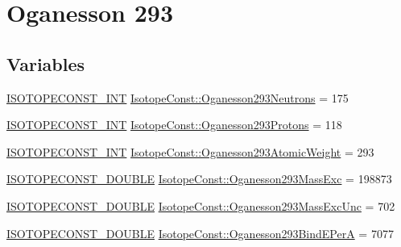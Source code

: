 \hypertarget{group___isotope_const-_oganesson-_og293}{}\section{Oganesson 293}
\label{group___isotope_const-_oganesson-_og293}
\subsection*{Variables}
\begin{DoxyCompactItemize}
\item 
\mbox{\hyperlink{group___isotope_const-_macros_ga5f18360b3e99483a35c32d789e62621c}{I\+S\+O\+T\+O\+P\+E\+C\+O\+N\+S\+T\+\_\+\+I\+NT}} \mbox{\hyperlink{group___isotope_const-_oganesson-_og293_ga6682bb751886375734ab60c8e5252a0c}{Isotope\+Const\+::\+Oganesson293\+Neutrons}} = 175
\item 
\mbox{\hyperlink{group___isotope_const-_macros_ga5f18360b3e99483a35c32d789e62621c}{I\+S\+O\+T\+O\+P\+E\+C\+O\+N\+S\+T\+\_\+\+I\+NT}} \mbox{\hyperlink{group___isotope_const-_oganesson-_og293_ga5a2761d4324cf25a3816a219de7347c4}{Isotope\+Const\+::\+Oganesson293\+Protons}} = 118
\item 
\mbox{\hyperlink{group___isotope_const-_macros_ga5f18360b3e99483a35c32d789e62621c}{I\+S\+O\+T\+O\+P\+E\+C\+O\+N\+S\+T\+\_\+\+I\+NT}} \mbox{\hyperlink{group___isotope_const-_oganesson-_og293_gabca899f36ee47f8f37a98065c55bfea8}{Isotope\+Const\+::\+Oganesson293\+Atomic\+Weight}} = 293
\item 
\mbox{\hyperlink{group___isotope_const-_macros_ga8f45a7272ce02c0b4c65c44636ed719a}{I\+S\+O\+T\+O\+P\+E\+C\+O\+N\+S\+T\+\_\+\+D\+O\+U\+B\+LE}} \mbox{\hyperlink{group___isotope_const-_oganesson-_og293_ga5d6feb2ff2c05270606aaf897b43aa1f}{Isotope\+Const\+::\+Oganesson293\+Mass\+Exc}} = 198873
\item 
\mbox{\hyperlink{group___isotope_const-_macros_ga8f45a7272ce02c0b4c65c44636ed719a}{I\+S\+O\+T\+O\+P\+E\+C\+O\+N\+S\+T\+\_\+\+D\+O\+U\+B\+LE}} \mbox{\hyperlink{group___isotope_const-_oganesson-_og293_gae6c5edd8ff80c67547e8956a09e62927}{Isotope\+Const\+::\+Oganesson293\+Mass\+Exc\+Unc}} = 702
\item 
\mbox{\hyperlink{group___isotope_const-_macros_ga8f45a7272ce02c0b4c65c44636ed719a}{I\+S\+O\+T\+O\+P\+E\+C\+O\+N\+S\+T\+\_\+\+D\+O\+U\+B\+LE}} \mbox{\hyperlink{group___isotope_const-_oganesson-_og293_ga77d9449d3905aae00bfd87be527c7090}{Isotope\+Const\+::\+Oganesson293\+Bind\+E\+PerA}} = 7077
\item 

\end{DoxyCompactItemize}
